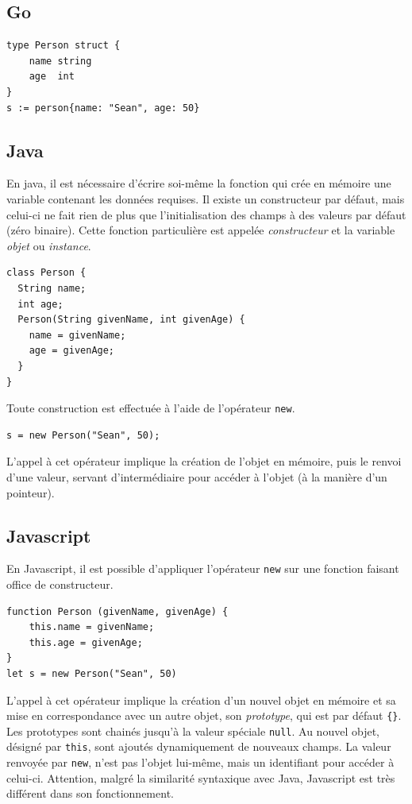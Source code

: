 \documentclass[a4paper,francais]{insalyon}
\begin{document}
\subsection{Go}

\begin{verbatim}
type Person struct {
    name string
    age  int
}    
s := person{name: "Sean", age: 50}
\end{verbatim}

\subsection{Java}

En java, il est nécessaire d'écrire soi-même la fonction qui crée en mémoire une variable contenant les données requises. Il existe un constructeur par défaut, mais celui-ci ne fait rien de plus que l'initialisation des champs à des valeurs par défaut (zéro binaire). Cette fonction particulière est appelée \emph{constructeur} et la variable \emph{objet} ou \emph{instance}. 
\begin{verbatim}
class Person {
  String name; 
  int age; 
  Person(String givenName, int givenAge) {
    name = givenName;
    age = givenAge;
  }
}
\end{verbatim}

Toute construction est effectuée à l'aide de l'opérateur \texttt{new}.  
\begin{verbatim}
s = new Person("Sean", 50);  
\end{verbatim}

L'appel à cet opérateur implique la création de l'objet en mémoire, puis le renvoi d'une valeur, servant d'intermédiaire pour accéder à l'objet (à la manière d'un pointeur).

\subsection{Javascript}

En Javascript, il est possible d'appliquer l'opérateur \texttt{new} sur une fonction faisant office de constructeur.
\begin{verbatim}
function Person (givenName, givenAge) {
    this.name = givenName; 
    this.age = givenAge; 
}
let s = new Person("Sean", 50)
\end{verbatim}
L'appel à cet opérateur implique la création d'un nouvel objet en mémoire et sa mise en correspondance avec un autre objet, son \emph{prototype}, qui est par défaut \verb!{}!. Les prototypes sont chainés jusqu'à la valeur spéciale \texttt{null}. Au nouvel objet, désigné par \texttt{this}, sont ajoutés dynamiquement de nouveaux champs. La valeur renvoyée par \texttt{new}, n'est pas l'objet lui-même, mais un identifiant pour accéder à celui-ci. Attention, malgré la similarité syntaxique avec Java, Javascript est très différent dans son fonctionnement.




\end{document}
